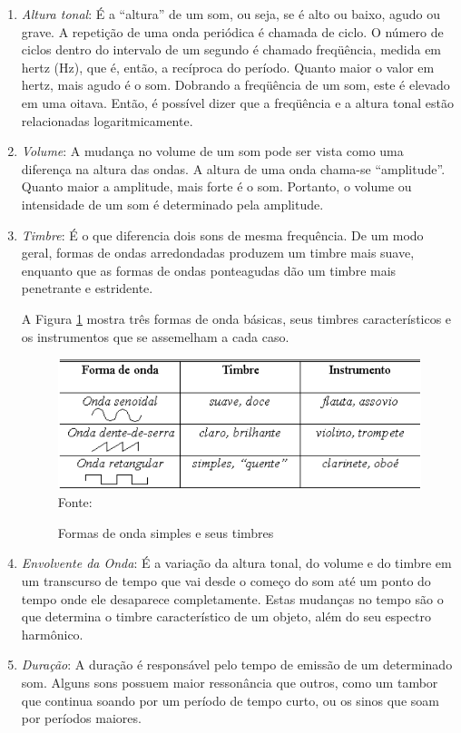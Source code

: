 \begin{enumerate}
\item \textit{Altura tonal}: É a “altura” de um som, ou seja, se é alto ou baixo, agudo ou grave. A repetição de uma onda periódica é chamada de ciclo. O número de ciclos dentro do intervalo de um segundo é chamado freqüência, medida em hertz (Hz), que é, então, a recíproca do período. Quanto maior o valor em hertz, mais agudo é o som. Dobrando a freqüência de um som, este é elevado em uma oitava. Então, é possível dizer que a freqüência e a altura tonal estão relacionadas logaritmicamente.

\item \textit{Volume}: A mudança no volume de um som pode ser vista como uma diferença na altura das ondas. A altura de uma onda chama-se “amplitude”. Quanto maior a amplitude, mais forte é o som. Portanto, o volume ou intensidade de um som é determinado pela amplitude.

\item \textit{Timbre}: É o que diferencia dois sons de mesma frequência. De um modo geral, formas de ondas arredondadas produzem um timbre mais suave, enquanto que as formas de ondas ponteagudas dão um timbre mais penetrante e estridente.

A Figura \ref{fig:ondaTimbre} mostra três formas de onda básicas, seus timbres característicos e os instrumentos que se assemelham a cada caso.

\begin{figure}[!htb]
   \centering
   \caption{Formas de onda simples e seus timbres}\label{fig:ondaTimbre} 
   \includegraphics[scale=0.50]{figuras/ondaTimbre.png}
   \\Fonte: \cite{miletto2004}
\end{figure}

\item \textit{Envolvente da Onda}: É a variação da altura tonal, do volume e do timbre em um transcurso de tempo que vai desde o começo do som até um ponto do tempo onde ele desaparece completamente. Estas mudanças no tempo são o que determina o timbre característico de um objeto, além do seu espectro harmônico.

\item \textit{Duração}: A duração é responsável pelo tempo de emissão de um determinado som. Alguns sons possuem maior ressonância que outros, como um tambor que continua soando por um período de tempo curto, ou os sinos que soam por períodos maiores.
\end{enumerate}


